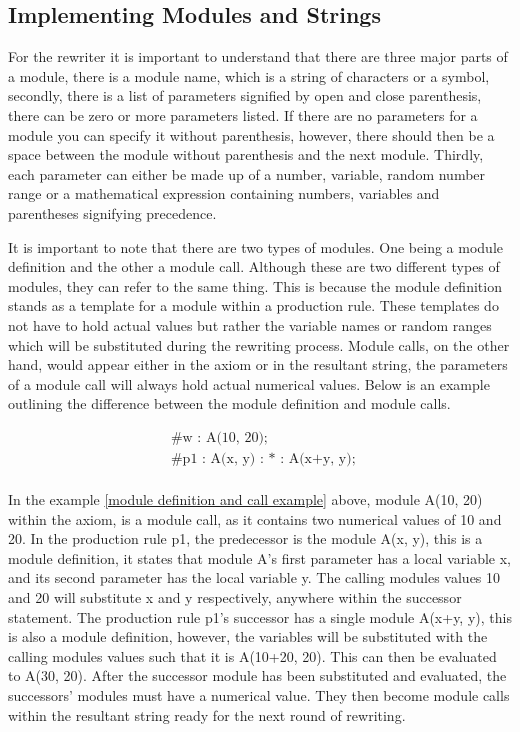 \subsection{Implementing Modules and Strings} \label{modules and strings}

For the rewriter it is important to understand that there are three major parts of a module, there is a module name, which is a string of characters or a symbol, secondly, there is a list of parameters signified by open and close parenthesis, there can be zero or more parameters listed. If there are no parameters for a module you can specify it without parenthesis, however, there should then be a space between the module without parenthesis and the next module. Thirdly, each parameter can either be made up of a number, variable, random number range or a mathematical expression containing numbers, variables and parentheses signifying precedence. 

It is important to note that there are two types of modules. One being a module definition and the other a module call. Although these are two different types of modules, they can refer to the same thing. This is because the module definition stands as a template for a module within a production rule. These templates do not have to hold actual values but rather the variable names or random ranges which will be substituted during the rewriting process. Module calls, on the other hand, would appear either in the axiom or in the resultant string, the parameters of a module call will always hold actual numerical values. Below is an example outlining the difference between the module definition and module calls.

\begin{equation} \label{module definition and call example}
\begin{aligned}
	&\text{\#w : A(10, 20);}\\
	&\text{\#p1 : A(x, y) : * : A(x+y, y); }\\
\end{aligned}
\end{equation}

\noindent
In the example \ref{module definition and call example} above, module A(10, 20) within the axiom, is a module call, as it contains two numerical values of 10 and 20. In the production rule p1, the predecessor is the module A(x, y), this is a module definition, it states that module A's first parameter has a local variable x, and its second parameter has the local variable y. The calling modules values 10 and 20 will substitute x and y respectively, anywhere within the successor statement. The production rule p1's successor has a single module A(x+y, y), this is also a module definition, however, the variables will be substituted with the calling modules values such that it is A(10+20, 20). This can then be evaluated to A(30, 20). After the successor module has been substituted and evaluated, the successors' modules must have a numerical value. They then become module calls within the resultant string ready for the next round of rewriting.

